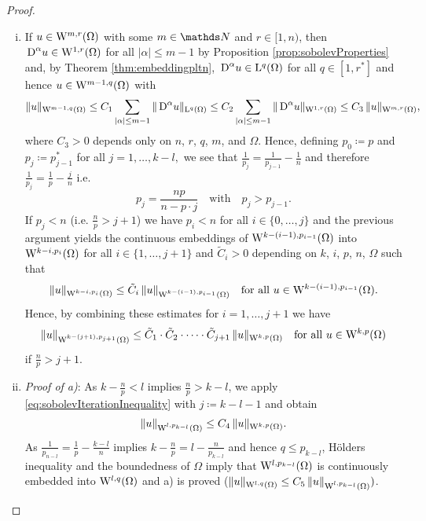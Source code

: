 \begin{proof}
  \begin{enumerate}[i)]
    \item If $u \in \mathrm{W}^{m,r}(\Omega)$ with some $m \in \N$ and $r \in [1,n)$, then $\,{\operatorname{D}}^\alpha u \in \mathrm{W}^{1,r}(\Omega)$ for all $|\alpha| \leq m - 1$ by Proposition \ref{prop:sobolevProperties} and, by Theorem \ref{thm:embeddingpltn}, $\,{\operatorname{D}}^\alpha u \in \mathrm{L}^q(\Omega)$ for all $q \in [1,r^*]$ and hence $u \in \mathrm{W}^{m - 1,q}(\Omega)$ with
    $$
    \|u\|_{\mathrm{W}^{m - 1,q}(\Omega)}
    \leq C_1 \sum_{|\alpha| \leq m - 1} \|\,{\operatorname{D}}^\alpha u\|_{\mathrm{L}^q(\Omega)}
    \leq C_2 \sum_{|\alpha| \leq m - 1} \|\,{\operatorname{D}}^\alpha u\|_{\mathrm{W}^{1,r}(\Omega)}
    \leq C_3 \, \|u\|_{\mathrm{W}^{m,r}(\Omega)},
    $$
    where $C_3 > 0$ depends only on $n$, $r$, $q$, $m$, and $\Omega$.
    Hence, defining 
    $p_0 \coloneqq p$ and $p_j \coloneqq p_{j - 1}^*$ for all $j = 1,\dots,k - l,$ we see that $\frac{1}{p_j} = \frac{1}{p_{j - 1}} - \frac{1}{n}$ and therefore $\frac{1}{p_j} = \frac{1}{p} - \frac{j}{n}$ i.e.
    $$
    p_j = \frac{np}{n- p\cdot j} \quad\text{with}\quad p_j > p_{j - 1}.
    $$
    If $p_j < n$ (i.e. $\frac{n}{p} > j + 1$) we have $p_i < n$ for all $i \in \{ 0, \dots, j\}$ and the previous argument yields the continuous embeddings of $\mathrm{W}^{k - (i - 1), p_{i - 1}}(\Omega)$ into $\mathrm{W}^{k-i,p_i}(\Omega)$ for all $i \in \{1,\dots,j+1\}$ and $\tilde C_i > 0$ depending on $k$, $i$, $p$, $n$, $\Omega$ such that
    $$
    \| u\|_{\mathrm{W}^{k - i,p_i}(\Omega)}
    \leq \tilde C_i \, \|u\|_{\mathrm{W}^{k-(i-1),p_{i - 1}}(\Omega)} \quad\text{for all } u \in \mathrm{W}^{k - ( i - 1),p_{i - 1}}(\Omega).
    $$
    Hence, by combining these estimates for $i = 1,\dots,j+1$ we have
    \begin{equation}
      \label{eq:sobolevIterationInequality}
      \|u\|_{\mathrm{W}^{k - (j + 1),p_{j + 1}}(\Omega)}
      \leq \tilde C_1 \cdot \tilde C_2 \cdot \dots \cdot \tilde C_{j + 1} \, \|u\|_{\mathrm{W}^{k,p}(\Omega)} \quad\text{for all } u \in \mathrm{W}^{k,p}(\Omega)
  \end{equation}
  if $\frac{n}{p} > j + 1$.

\item \emph{Proof of a)}:
  As $k - \frac{n}{p} < l$ implies $\frac{n}{p} > k - l$, we apply \eqref{eq:sobolevIterationInequality} with $j \coloneqq k - l - 1$ and obtain 
  $$
  \|u\|_{\mathrm{W}^{l,p_{k - l}}(\Omega)} \leq C_4 \, \|u\|_{\mathrm{W}^{k,p}(\Omega)}.
  $$
  As $\frac{1}{p_{n - l}} = \frac{1}{p} - \frac{k - l}{n}$ implies $k - \frac{n}{p} = l - \frac{n}{p_{k - l}}$ and hence $q \leq p_{k - l}$, Hölders inequality and the boundedness of $\Omega$ imply that $\mathrm{W}^{l,p_{k - l}}(\Omega)$ is continuously embedded into $\mathrm{W}^{l,q}(\Omega)$ and a) is proved ($\|u\|_{\mathrm{W}^{l,q}(\Omega)} \leq C_5\, \|u\|_{\mathrm{W}^{l,p_{k - l}}(\Omega)})$.


\end{enumerate}
\end{proof}
